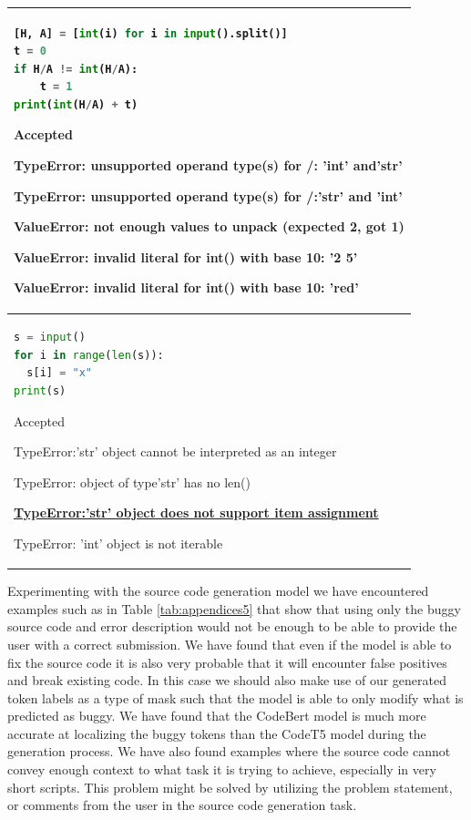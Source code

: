 \documentclass[12pt,a4paper]{report}
\begin{document}
\begin{appendices}
\begin{table}[H]
\begin{tabular}{p{15cm}}
\hline
\begin{lstlisting}[language=Python]
[H, A] = [int(i) for i in input().split()]
t = 0
if H/A != int(H/A):
    t = 1
print(int(H/A) + t)
\end{lstlisting}

Accepted

TypeError: unsupported operand type(s) for /: 'int' and'str'

TypeError: unsupported operand type(s) for /:'str' and 'int'

ValueError: not enough values to unpack (expected 2, got 1)

ValueError: invalid literal for int() with base 10: '2 5'

\textbf{ValueError: invalid literal for int() with base 10: 'red'}

\\

\hline
\begin{lstlisting}[language=Python]
s = input()
for i in range(len(s)):
  s[i] = "x"
print(s)
\end{lstlisting}

Accepted

TypeError:'str' object cannot be interpreted as an integer

TypeError: object of type'str' has no len()

\underline{\textbf{TypeError:'str' object does not support item assignment}}

TypeError: 'int' object is not iterable

\\

\end{tabular}
\end{table}

Experimenting with the source code generation model we have encountered examples such as in Table \ref{tab:appendices5} that show that using only the buggy source code and error description would not be enough to be able to provide the user with a correct submission. We have found that even if the model is able to fix the source code it is also very probable that it will encounter false positives and break existing code. In this case we should also make use of our generated token labels as a type of mask such that the model is able to only modify what is predicted as buggy. We have found that the CodeBert model is much more accurate at localizing the buggy tokens than the CodeT5 model during the generation process. We have also found examples where the source code cannot convey enough context to what task it is trying to achieve, especially in very short scripts. This problem might be solved by utilizing the problem statement, or comments from the user in the source code generation task.


\end{appendices}
\end{document}
